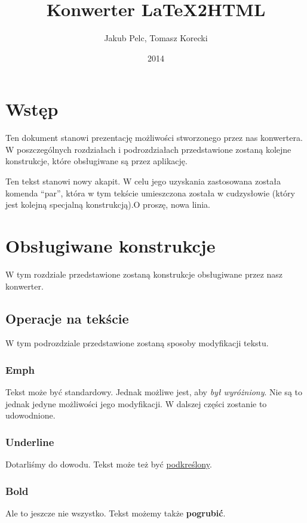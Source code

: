 \documentclass[10pt,a4paper]{article}
\title{Konwerter LaTeX2HTML}
\author{Jakub Pelc, Tomasz Korecki}
\date{2014}
\begin{document}
\maketitle

\section{Wstęp}
Ten dokument stanowi prezentację możliwości stworzonego przez nas konwertera. W poszczególnych rozdziałach i podrozdziałach przedstawione zostaną kolejne konstrukcje, które obsługiwane są przez aplikację.\par
Ten tekst stanowi nowy akapit. W celu jego uzyskania zastosowana została komenda ``par'', która w tym tekście umieszczona została w cudzysłowie (który jest kolejną specjalną konstrukcją).\newline O proszę, nowa linia.

\section{Obsługiwane konstrukcje}
W tym rozdziale przedstawione zostaną konstrukcje obsługiwane przez nasz konwerter.

\subsection{Operacje na tekście}
W tym podrozdziale przedstawione zostaną sposoby modyfikacji tekstu.

\subsubsection{Emph}
Tekst może być standardowy. Jednak możliwe jest, aby \emph{był wyróżniony}. Nie są to jednak jedyne możliwości jego modyfikacji. W dalszej części zostanie to udowodnione.

\subsubsection{Underline}
Dotarliśmy do dowodu. Tekst może też być \underline{podkreślony}.

\subsubsection{Bold}
Ale to jeszcze nie wszystko. Tekst możemy także \textbf{pogrubić}.
 
\end{document}
